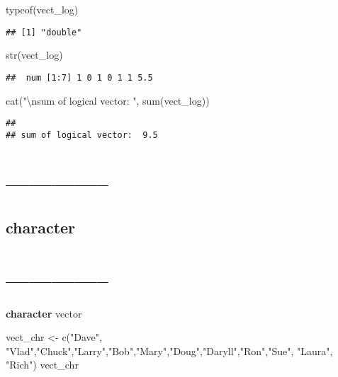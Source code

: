 \documentclass[
]{article}
\newenvironment{Shaded}{\begin{snugshade}}{\end{snugshade}}
\newcommand{\FunctionTok}[1]{\textcolor[rgb]{0.00,0.00,0.00}{#1}}
\newcommand{\NormalTok}[1]{#1}
\newcommand{\OtherTok}[1]{\textcolor[rgb]{0.56,0.35,0.01}{#1}}
\newcommand{\SpecialCharTok}[1]{\textcolor[rgb]{0.00,0.00,0.00}{#1}}
\newcommand{\StringTok}[1]{\textcolor[rgb]{0.31,0.60,0.02}{#1}}
\begin{document}
\begin{Shaded}
\begin{Highlighting}[]
\FunctionTok{typeof}\NormalTok{(vect\_log)}
\end{Highlighting}
\end{Shaded}

\begin{verbatim}
## [1] "double"
\end{verbatim}

\begin{Shaded}
\begin{Highlighting}[]
\FunctionTok{str}\NormalTok{(vect\_log)}
\end{Highlighting}
\end{Shaded}

\begin{verbatim}
##  num [1:7] 1 0 1 0 1 1 5.5
\end{verbatim}

\begin{Shaded}
\begin{Highlighting}[]
\FunctionTok{cat}\NormalTok{(}\StringTok{"}\SpecialCharTok{\textbackslash{}n}\StringTok{sum of logical vector: "}\NormalTok{, }\FunctionTok{sum}\NormalTok{(vect\_log))}
\end{Highlighting}
\end{Shaded}

\begin{verbatim}
## 
## sum of logical vector:  9.5
\end{verbatim}

\hypertarget{section-14}{%
\section{--------------}\label{section-14}}

\hypertarget{character}{%
\subsection{character}\label{character}}

\hypertarget{section-15}{%
\section{--------------}\label{section-15}}

\textbf{character} vector

\begin{Shaded}
\begin{Highlighting}[]
\NormalTok{vect\_chr }\OtherTok{\textless{}{-}} \FunctionTok{c}\NormalTok{(}\StringTok{"Dave"}\NormalTok{, }\StringTok{"Vlad"}\NormalTok{,}\StringTok{"Chuck"}\NormalTok{,}\StringTok{"Larry"}\NormalTok{,}\StringTok{"Bob"}\NormalTok{,}\StringTok{"Mary"}\NormalTok{,}\StringTok{"Doug"}\NormalTok{,}\StringTok{"Daryll"}\NormalTok{,}\StringTok{"Ron"}\NormalTok{,}\StringTok{"Sue"}\NormalTok{, }\StringTok{"Laura"}\NormalTok{, }\StringTok{"Rich"}\NormalTok{)}
\NormalTok{vect\_chr}
\end{Highlighting}
\end{Shaded}
\end{document}
